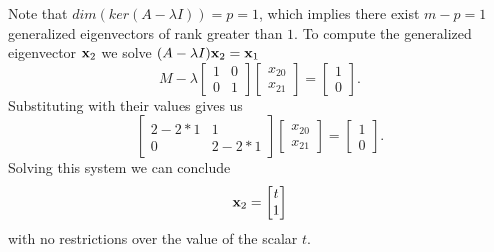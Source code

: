 \begin{example}
    Note that \(dim(ker(A - \lambda I)) = p = 1\), which implies
    there exist \(m - p = 1\) generalized eigenvectors of rank greater than \(1\). To compute the generalized eigenvector
    \(\vb{x}_{2}\) we solve \((A - \lambda I)\vb{x}_{2} = \vb{x}_{1}\)
    \[
        M - \lambda
        \begin{bmatrix}
            1 & 0 \\
            0 & 1
        \end{bmatrix}
        \begin{bmatrix}
            x_{20} \\
            x_{21}
        \end{bmatrix}
        =
        \begin{bmatrix}
            1 \\
            0
        \end{bmatrix}.
    \]
    Substituting with their values gives us
    \[
        \begin{bmatrix}
            2 - 2*1 & 1       \\
                0   & 2 - 2*1
        \end{bmatrix}
        \begin{bmatrix}
            x_{20} \\
            x_{21}
        \end{bmatrix}
        =
        \begin{bmatrix}
            1 \\
            0
        \end{bmatrix}.
    \]
    Solving this system we can conclude
    \[
        \vb{x}_{2} = \begin{bmatrix} t \\ 1 \end{bmatrix}
    \]
    with no restrictions over the value of the scalar \(t\).
\end{example}


